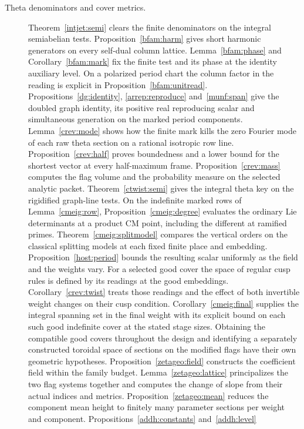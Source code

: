 \begin{description}
\item[Theta denominators and cover metrics.]
Theorem~\ref{intjet:semi} clears the finite denominators on the integral
semiabelian tests. Proposition~\ref{bfam:harm} gives short harmonic
generators on every self-dual column lattice. Lemma~\ref{bfam:phase}
and Corollary~\ref{bfam:mark} fix the finite test and its phase at the
identity auxiliary level. On a polarized period chart the column
factor in the reading is explicit in Proposition~\ref{bfam:unitread}.
Propositions~\ref{dg:identity}, \ref{arrep:reproduce}
and~\ref{munf:span} give the doubled graph identity, its positive real
reproducing scalar and simultaneous generation on the marked period
components. Lemma~\ref{crev:mode} shows how the finite mark kills
the zero Fourier mode of each raw theta section on a rational
isotropic row line. Proposition~\ref{crev:half} proves boundedness
and a lower bound for the shortest vector at every half-maximum
frame. Proposition~\ref{crev:mass} computes the flag volume and
the probability measure on the selected analytic packet.
Theorem~\ref{ctwist:semi} gives the integral theta key on the
rigidified graph-line tests. On the indefinite marked rows of
Lemma~\ref{cmeig:row}, Proposition~\ref{cmeig:degree} evaluates
the ordinary Lie determinants at a product CM point, including
the different at ramified primes. Theorem~\ref{cmeig:splitmodel}
compares the vertical orders on the classical splitting models
at each fixed finite place and embedding.
Proposition~\ref{host:period} bounds the resulting scalar uniformly
as the field and the weights vary. For a selected good cover the
space of regular cusp rules is defined by its readings at the good
embeddings. Corollary~\ref{crev:twist} treats those readings and the
effect of both invertible weight changes on their cusp condition.
Corollary~\ref{cmeig:final} supplies the integral spanning set in
the final weight with its explicit bound on each such good
indefinite cover at the stated stage sizes.
Obtaining the compatible good covers throughout the design and
identifying a separately constructed toroidal space of sections
on the modified flags have their own geometric hypotheses.
Proposition~\ref{zetageo:field} constructs the coefficient field within
the family budget. Lemma~\ref{zetageo:lattice} principalizes the two flag
systems together and computes the change of slope from their actual
indices and metrics. Proposition~\ref{zetageo:mean} reduces the
component mean height to finitely many parameter sections per weight
and component. Propositions~\ref{addh:constants} and~\ref{addh:level}

\end{description}
